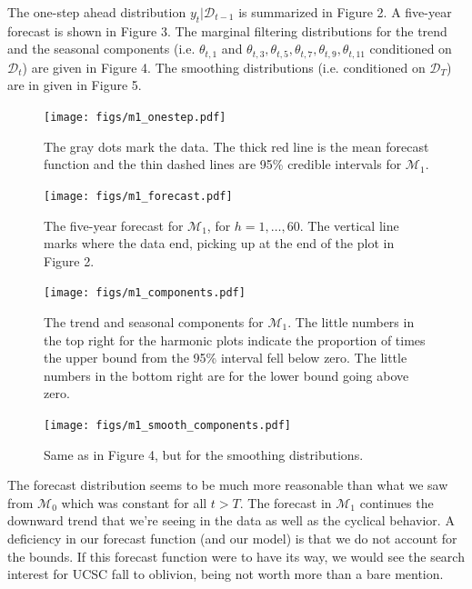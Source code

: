 \documentclass[12pt]{article}
\begin{document}
\noindent The one-step ahead distribution $y_t|\mathcal{D}_{t-1}$ is summarized in Figure 2. A five-year forecast is shown in Figure 3. The marginal filtering distributions for the trend and the seasonal components (i.e. $\theta_{t,1}$ and $\theta_{t,3}, \theta_{t,5}, \theta_{t,7}, \theta_{t,9}, \theta_{t,11}$ conditioned on $\mathcal{D}_t$) are given in Figure 4. The smoothing distributions (i.e. conditioned on $\mathcal{D}_T$) are in given in Figure 5.
\bigskip

\begin{figure}[H]
\begin{center}
\texttt{[image: figs/m1\_onestep.pdf]}
\end{center}
\caption{The gray dots mark the data. The thick red line is the mean forecast function and the thin dashed lines are 95\% credible intervals for $\mathcal{M}_1$.}
\end{figure}

\begin{figure}[H]
\begin{center}
\texttt{[image: figs/m1\_forecast.pdf]}
\end{center}
\caption{The five-year forecast for $\mathcal{M}_1$, for $h=1,\ldots,60$. The vertical line marks where the data end, picking up at the end of the plot in Figure 2.}
\end{figure}

\begin{figure}[H]
\begin{center}
\texttt{[image: figs/m1\_components.pdf]}
\end{center}
\caption{The trend and seasonal components for $\mathcal{M}_1$. The little numbers in the top right for the harmonic plots indicate the proportion of times the upper bound from the 95\% interval fell below zero. The little numbers in the bottom right are for the lower bound going above zero.}
\end{figure}

\begin{figure}[H]
\begin{center}
\texttt{[image: figs/m1\_smooth\_components.pdf]}
\end{center}
\caption{Same as in Figure 4, but for the smoothing distributions.}
\end{figure}

\newpage
\noindent The forecast distribution seems to be much more reasonable than what we saw from $\mathcal{M}_0$ which was constant for all $t>T$. The forecast in $\mathcal{M}_1$ continues the downward trend that we're seeing in the data as well as the cyclical behavior. A deficiency in our forecast function (and our model) is that we do not account for the bounds. If this forecast function were to have its way, we would see the search interest for UCSC fall to oblivion, being not worth more than a bare mention.
\bigskip
\end{document}
